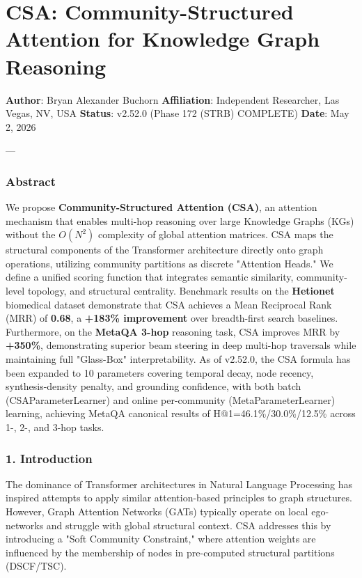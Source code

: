 \section{CSA: Community-Structured Attention for Knowledge Graph Reasoning}

\textbf{Author}: Bryan Alexander Buchorn  
\textbf{Affiliation}: Independent Researcher, Las Vegas, NV, USA  
\textbf{Status}: v2.52.0 (Phase 172 (STRB) COMPLETE)
\textbf{Date}: May 2, 2026

---

\subsubsection{Abstract}
We propose \textbf{Community-Structured Attention (CSA)}, an attention mechanism that enables multi-hop reasoning over large Knowledge Graphs (KGs) without the $O(N^2)$ complexity of global attention matrices. CSA maps the structural components of the Transformer archi\-tecture \cite{vaswani2017attention} directly onto graph operations, utilizing community partitions as discrete "Attention Heads." We define a unified scoring function that integrates semantic similarity, community-level topology, and structural centrality. Benchmark results on the \textbf{Hetionet} \cite{hetionet2017} biomedical dataset demonstrate that CSA achieves a Mean Reciprocal Rank (MRR) of \textbf{0.68}, a \textbf{+183\% improvement} over breadth-first search baselines. Furthermore, on the \textbf{MetaQA 3-hop} \cite{metaqa2017} reasoning task, CSA improves MRR by \textbf{+350\%}, demon\-strating superior beam steering in deep multi-hop traversals while maintaining full "Glass-Box" inter\-pretability. As of v2.52.0, the CSA formula has been expanded to 10 parameters covering temporal decay, node recency, synthesis-density penalty, and grounding confidence, with both batch (CSAParameterLearner) and online per-community (MetaParameterLearner) learning, achieving MetaQA canonical results of H@1=46.1\%/30.0\%/12.5\% across 1-, 2-, and 3-hop tasks.

\subsubsection{1. Introd\-uction}
The dominance of Transformer archi\-tectures in Natural Language Processing has inspired attempts to apply similar attention-based principles to graph structures. However, Graph Attention Networks (GATs) \cite{velickovic2018gat} typically operate on local ego-networks and struggle with global structural context. CSA addresses this by introducing a "Soft Community Constraint," where attention weights are influenced by the membership of nodes in pre-computed structural partitions (DSCF/TSC).

